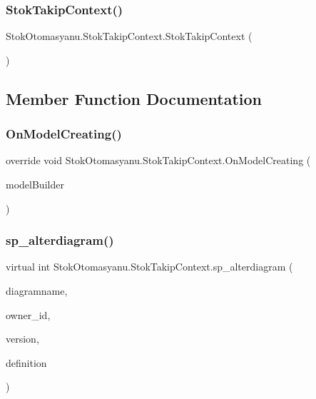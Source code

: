 \subsubsection{Stok\+Takip\+Context()}
{\footnotesize\ttfamily Stok\+Otomasyanu.\+Stok\+Takip\+Context.\+Stok\+Takip\+Context (\begin{DoxyParamCaption}{ }\end{DoxyParamCaption})}



\subsection{Member Function Documentation}
\mbox{\label{class_stok_otomasyanu_1_1_stok_takip_context_a04090ef6db19ac55028de6f341d9a71f}} 
\subsubsection{On\+Model\+Creating()}
{\footnotesize\ttfamily override void Stok\+Otomasyanu.\+Stok\+Takip\+Context.\+On\+Model\+Creating (\begin{DoxyParamCaption}\item[{Db\+Model\+Builder}]{model\+Builder }\end{DoxyParamCaption})\hspace{0.3cm}{\ttfamily [protected]}}

\mbox{\label{class_stok_otomasyanu_1_1_stok_takip_context_a03f789a99339ad2b0bf4df5deff71f14}} 
\subsubsection{sp\+\_\+alterdiagram()}
{\footnotesize\ttfamily virtual int Stok\+Otomasyanu.\+Stok\+Takip\+Context.\+sp\+\_\+alterdiagram (\begin{DoxyParamCaption}\item[{string}]{diagramname,  }\item[{Nullable$<$ int $>$}]{owner\+\_\+id,  }\item[{Nullable$<$ int $>$}]{version,  }\item[{byte [$\,$]}]{definition }\end{DoxyParamCaption})\hspace{0.3cm}{\ttfamily [virtual]}}

